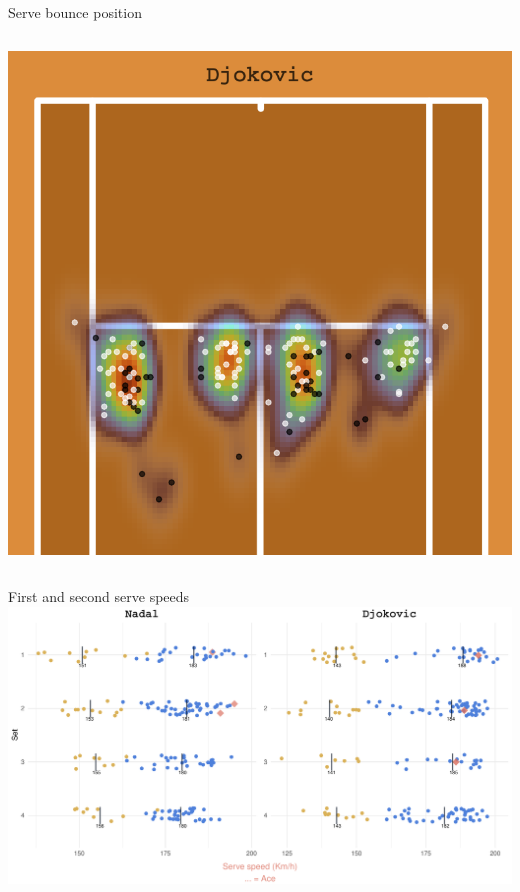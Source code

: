 \documentclass[
  ignorenonframetext,
]{beamer}
\begin{document}
\begin{frame}{Serve bounce position}
\begin{column}{0.48\textwidth}
\includegraphics{presentationtest1+_files/figure-beamer/Djokovic serve-1.pdf}
\end{column}
\end{frame}

\begin{frame}{{First} and {second} serve speeds}
\protect\hypertarget{first-and-second-serve-speeds}{}
\includegraphics{presentationtest1+_files/figure-beamer/plot grid speed-1.pdf}
\end{frame}
\end{document}
